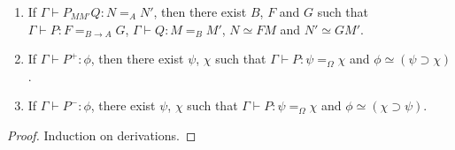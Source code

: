 \begin{lemma}[Generation]
\begin{enumerate}
\item
If $\Gamma \vdash P_{M M'} Q : N =_A N'$, then there exist $B$, $F$ and $G$ such that $\Gamma \vdash P : F =_{B \rightarrow A} G$, $\Gamma \vdash Q : M =_B M'$, $N \simeq F M$
and $N' \simeq G M'$.
\item
If $\Gamma \vdash P^+ : \phi$, then there exist $\psi$, $\chi$ such that $\Gamma \vdash P : \psi =_\Omega \chi$ and $\phi \simeq (\psi \supset \chi)$.
\item
If $\Gamma \vdash P^- : \phi$, there exist $\psi$, $\chi$ such that $\Gamma \vdash P : \psi =_\Omega \chi$ and $\phi \simeq (\chi \supset \psi)$.
\end{enumerate}
\end{lemma}

\begin{proof}
Induction on derivations.
\end{proof}


